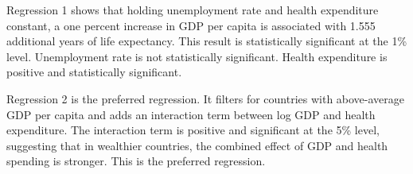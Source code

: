 \documentclass[
]{article}
\begin{document}
Regression 1 shows that holding unemployment rate and health expenditure
constant, a one percent increase in GDP per capita is associated with
1.555 additional years of life expectancy. This result is statistically
significant at the 1\% level. Unemployment rate is not statistically
significant. Health expenditure is positive and statistically
significant.

Regression 2 is the preferred regression. It filters for countries with
above-average GDP per capita and adds an interaction term between log
GDP and health expenditure. The interaction term is positive and
significant at the 5\% level, suggesting that in wealthier countries,
the combined effect of GDP and health spending is stronger. This is the
preferred regression.
\end{document}
